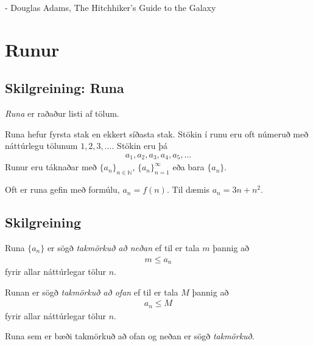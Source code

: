 \documentclass[b5paper,11pt,icelandic]{sphinxmanual}
\begin{document}
- Douglas Adams, The Hitchhiker's Guide to the Galaxy


\section{Runur}
\label{kafli09:index-0}\label{kafli09:runur}

\subsection{Skilgreining: Runa}
\label{kafli09:skilgreining-runa}
\emph{Runa} er raðaður listi af tölum.

Runa hefur fyrsta stak en ekkert síðasta stak. Stökin í runu eru oft
númeruð með náttúrlegu tölunum \(1, 2, 3, \ldots\). Stökin eru þá
\begin{equation*}
\begin{split}a_1, a_2, a_3, a_4, a_5, \ldots\end{split}
\end{equation*}
Runur eru táknaðar með \(\{a_n\}_{n\in {{{\mathbb  N}}}}\),
\(\{a_n\}_{n=1}^\infty\) eða bara \(\{a_n\}\).

Oft er runa gefin með formúlu, \(a_n = f(n)\). Til dæmis
\(a_n = 3n + n^2\).


\subsection{Skilgreining}
\label{kafli09:skilgreining}\label{kafli09:index-1}
Runa \(\{a_n\}\) er sögð \emph{takmörkuð að neðan} ef til er tala
\(m\) þannig að
\begin{equation*}
\begin{split}m\leq a_n\end{split}
\end{equation*}
fyrir allar náttúrlegar tölur \(n\).

Runan er sögð \emph{takmörkuð að ofan} ef til er tala \(M\) þannig að
\begin{equation*}
\begin{split}a_n\leq M\end{split}
\end{equation*}
fyrir allar náttúrlegar tölur \(n\).

Runa sem er bæði takmörkuð að ofan og neðan er sögð \emph{takmörkuð}.

\end{document}
